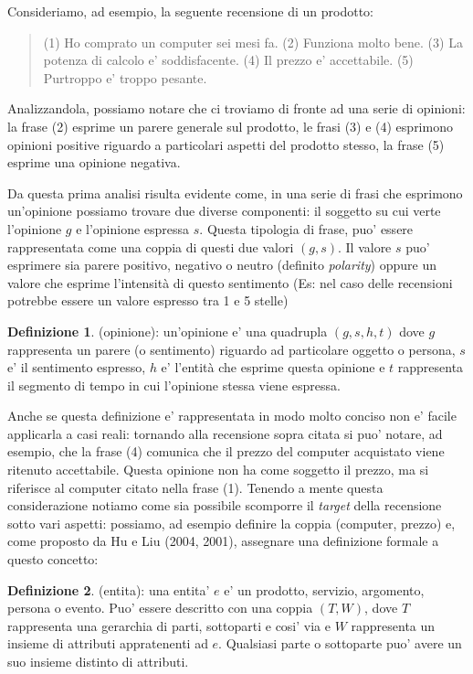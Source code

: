 \documentclass[a4paper,12pt,openright,twoside]{report}
\theoremstyle{definition}
\newtheorem{defi}{Definizione}[section]
\begin{document}
Consideriamo, ad esempio, la seguente recensione di un prodotto:
\begin{quote}
(1) Ho comprato un computer sei mesi fa. (2) Funziona molto bene. (3) La potenza
di calcolo e' soddisfacente. (4) Il prezzo e' accettabile. (5) Purtroppo e' troppo pesante.
\end{quote}
Analizzandola, possiamo notare che ci troviamo di fronte ad una serie di opinioni: la frase (2) esprime un 
parere generale sul prodotto, le frasi (3) e (4) esprimono opinioni positive riguardo
a particolari aspetti del prodotto stesso, la frase (5) esprime una opinione negativa.

Da questa prima analisi risulta evidente come, in una serie di frasi che esprimono un'opinione 
possiamo trovare due diverse componenti:
il soggetto su cui verte l'opinione $g$ e l'opinione espressa $s$.
Questa tipologia di frase, puo' essere rappresentata come una coppia di questi due valori $(g,s)$.
Il valore $s$ puo' esprimere sia parere positivo, negativo o neutro (definito \emph{polarity}) oppure un valore che 
esprime l'intensità di questo sentimento (Es: nel caso delle recensioni potrebbe
essere un valore espresso tra 1 e 5 stelle)

\begin{defi}(opinione): un'opinione e' una quadrupla $(g, s, h, t)$ dove $g$ rappresenta un parere
(o sentimento) riguardo ad particolare oggetto o persona, $s$ e' il sentimento espresso,
$h$ e' l'entità che esprime questa opinione e $t$ rappresenta il segmento  di tempo in cui
l'opinione stessa viene espressa.
\end{defi}

Anche se questa definizione e' rappresentata in modo molto conciso non e' facile applicarla
a casi reali: tornando alla recensione sopra citata si puo' notare, ad esempio, che
la frase (4) comunica che il prezzo del computer acquistato viene ritenuto 
accettabile. Questa opinione non ha come soggetto il prezzo, ma si riferisce al computer
citato nella frase (1). Tenendo a mente questa considerazione notiamo come
sia possibile scomporre il \emph{target} della recensione sotto vari aspetti: possiamo, ad esempio
definire la coppia (computer, prezzo) e, come proposto da Hu e Liu (2004, 2001), %
assegnare una definizione formale a questo concetto:

\begin{defi}(entita): una entita' $e$ e' un prodotto, servizio, argomento, persona o evento.
Puo' essere descritto con una coppia $(T,W)$, dove $T$ rappresenta una gerarchia di parti, sottoparti 
e cosi' via e $W$ rappresenta un insieme di attributi appratenenti ad $e$. Qualsiasi parte o sottoparte puo'
avere un suo insieme distinto di attributi.
\end{defi}
\end{document}
